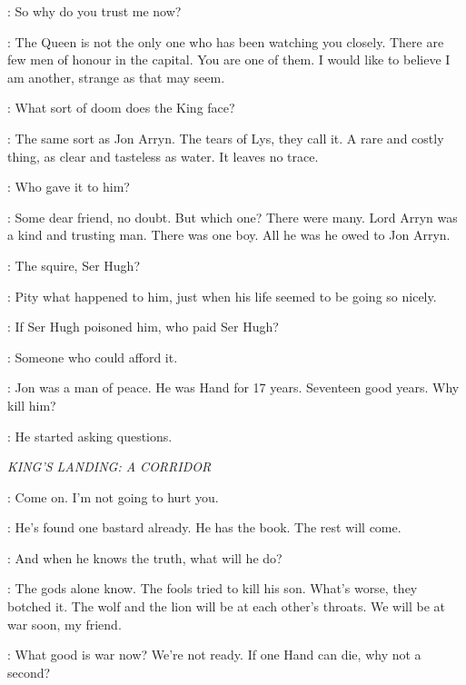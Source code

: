 \NED: So why do you trust me now? 

\VARYS: The Queen is not the only one who has been watching you closely. There are few men of honour in the capital. You are one of them. I would like to believe I am another, strange as that may seem. 

\NED: What sort of doom does the King face? 

\VARYS: The same sort as Jon Arryn. The tears of Lys, they call it. A rare and costly thing, as clear and tasteless as water. It leaves no trace. 

\NED: Who gave it to him? 

\VARYS: Some dear friend, no doubt. But which one? There were many. Lord Arryn was a kind and trusting man. There was one boy.  All he was he owed to Jon Arryn. 

\NED: The squire, Ser Hugh? 

\VARYS: Pity what happened to him, just when his life seemed to be going so nicely. 

\NED: If Ser Hugh poisoned him, who paid Ser Hugh? 

\VARYS: Someone who could afford it. 

\NED: Jon was a man of peace. He was Hand for 17 years. Seventeen good years. Why kill him? 

\VARYS: He started asking questions. 


\scene

\textit{KING'S LANDING: A CORRIDOR} 


\ARYA: Come on. I'm not going to hurt you. 


\VARYS: He's found one bastard already. He has the book. The rest will come. 

\ILLYRIO: And when he knows the truth, what will he do? 

\VARYS: The gods alone know. The fools tried to kill his son. What's worse, they botched it.  The wolf and the lion will be at each other's throats. We will be at war soon, my friend. 

\ILLYRIO: What good is war now? We're not ready. If one Hand can die, why not a second? 


